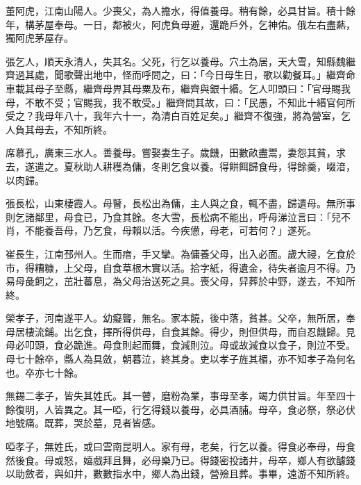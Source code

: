 \begin{pinyinscope}
董阿虎，江南山陽人。少喪父，為人擔水，得值養母。稍有餘，必具甘旨。積十餘年，構茅屋奉母。一日，鄰被火，阿虎負母避，還跪戶外，乞神佑。俄左右盡爇，獨阿虎茅屋存。

張乞人，順天永清人，失其名。父死，行乞以養母。穴土為居，天大雪，知縣魏繼齊過其處，聞歌聲出地中，怪而呼問之，曰：「今日母生日，歌以勸餐耳。」繼齊命車載其母子至縣，繼齊母畀其母粟及布，繼齊與銀十緡。乞人叩頭曰：「官母賜我母，不敢不受；官賜我，我不敢受。」繼齊問其故，曰：「民愚，不知此十緡官何所受之？我母年八十，我年六十一，為清白百姓足矣。」繼齊不復強，將為營室，乞人負其母去，不知所終。

席慕孔，廣東三水人。善養母。嘗娶妻生子。歲饑，田數畝盡鬻，妻怨其貧，求去，遂遣之。夏秋助人耕穫為傭，冬則乞食以養。得餅餌歸食母，得餘羹，啜湆，以肉歸。

張長松，山東棲霞人。母瞽，長松出為傭，主人與之食，輒不盡，歸遺母。無所事則乞諸鄰里，母食已，乃食其餘。冬大雪，長松病不能出，呼母涕泣言曰：「兒不肖，不能養吾母，乃乞食，母賴以活。今疾憊，母老，可若何？」遂死。

崔長生，江南邳州人。生而瘖，手又攣。為傭養父母，出入必面。歲大祲，乞食於市，得糟糠，上父母，自食草根木實以活。拾字紙，得遺金，待失者逾月不得。乃易母彘飼之，茁壯蕃息，為父母治送死之具。喪父母，舁葬於中野，遂去，不知所終。

榮孝子，河南遂平人。幼癡聾，無名。家本饒，後中落，貧甚。父卒，無所居，奉母居棲流鋪。出乞食，擇所得供母，自食其餘。得少，則但供母，而自忍饑歸。見母必叩頭，食必跪進。母食則起而舞，食減則泣。母或故減食以食子，則泣不受。母七十餘卒，縣人為具斂，朝暮泣，終其身。吏以孝子旌其楣，亦不知孝子為何名也。卒亦七十餘。

無錫二孝子，皆失其姓氏。其一瞽，磨粉為業，事母至孝，竭力供甘旨。年至四十餘復明，人皆異之。其一啞，行乞得錢以養母，必具酒脯。母卒，食必祭，祭必伏地號痛。既葬，哭於墓，見者皆感。

啞孝子，無姓氏，或曰雲南昆明人。家有母，老矣，行乞以養。得食必奉母，母食然後食。母或怒，嬉戲拜且舞，必母樂乃已。得錢密投諸井，母卒，鄉人有欲醵錢以助斂者，與如井，數數指水中，鄉人為出錢，營殮且葬。事畢，遠游不知所終。


\end{pinyinscope}